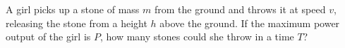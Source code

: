 A girl picks up a stone of mass $m$ from the ground and throws it at
speed $v$, releasing the stone from a height $h$ above the ground. If
the maximum power output of the girl is $P$, how many stones could
she throw in a time $T$?
